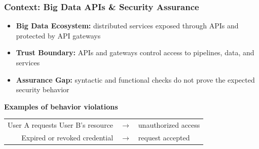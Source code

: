 \begin{frame}
    \frametitle{Context: Big Data APIs \& Security Assurance}

    \begin{itemize}
        \item \textbf{Big Data Ecosystem:} distributed services exposed through \alert{APIs} and protected by API \alert{gateways}
              \pause

        \item \textbf{Trust Boundary:} APIs and gateways control access to pipelines, data, and services
              \pause

        \item \textbf{Assurance Gap:} syntactic and functional checks do not prove the expected \alert{security behavior}
    \end{itemize}

    \vspace{0.4em}
    \begin{center}
        \textbf{Examples of \alert{behavior} violations}

        \vspace{0.4em}
        \begin{tabular}{rcl}
            User A requests User B's resource
             & $\rightarrow$ & unauthorized access \\[0.4em]
            Expired or revoked credential
             & $\rightarrow$ & request accepted
        \end{tabular}
    \end{center}

\end{frame}

